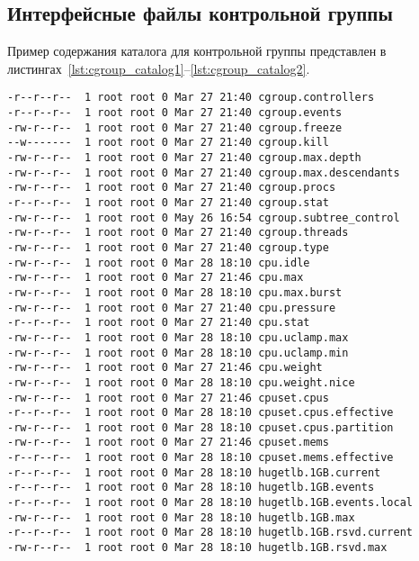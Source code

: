 \begin{appendices}

\chapter{Интерфейсные файлы контрольной группы}

Пример содержания каталога для контрольной группы представлен в листингах~\ref{lst:cgroup_catalog1}--\ref{lst:cgroup_catalog2}.

\begin{lstlisting}[label=lst:cgroup_catalog1, caption={Интерфейсные файлы для контрольной группы}]
-r--r--r--  1 root root 0 Mar 27 21:40 cgroup.controllers
-r--r--r--  1 root root 0 Mar 27 21:40 cgroup.events
-rw-r--r--  1 root root 0 Mar 27 21:40 cgroup.freeze
--w-------  1 root root 0 Mar 27 21:40 cgroup.kill
-rw-r--r--  1 root root 0 Mar 27 21:40 cgroup.max.depth
-rw-r--r--  1 root root 0 Mar 27 21:40 cgroup.max.descendants
-rw-r--r--  1 root root 0 Mar 27 21:40 cgroup.procs
-r--r--r--  1 root root 0 Mar 27 21:40 cgroup.stat
-rw-r--r--  1 root root 0 May 26 16:54 cgroup.subtree_control
-rw-r--r--  1 root root 0 Mar 27 21:40 cgroup.threads
-rw-r--r--  1 root root 0 Mar 27 21:40 cgroup.type
-rw-r--r--  1 root root 0 Mar 28 18:10 cpu.idle
-rw-r--r--  1 root root 0 Mar 27 21:46 cpu.max
-rw-r--r--  1 root root 0 Mar 28 18:10 cpu.max.burst
-rw-r--r--  1 root root 0 Mar 27 21:40 cpu.pressure
-r--r--r--  1 root root 0 Mar 27 21:40 cpu.stat
-rw-r--r--  1 root root 0 Mar 28 18:10 cpu.uclamp.max
-rw-r--r--  1 root root 0 Mar 28 18:10 cpu.uclamp.min
-rw-r--r--  1 root root 0 Mar 27 21:46 cpu.weight
-rw-r--r--  1 root root 0 Mar 28 18:10 cpu.weight.nice
-rw-r--r--  1 root root 0 Mar 27 21:46 cpuset.cpus
-r--r--r--  1 root root 0 Mar 28 18:10 cpuset.cpus.effective
-rw-r--r--  1 root root 0 Mar 28 18:10 cpuset.cpus.partition
-rw-r--r--  1 root root 0 Mar 27 21:46 cpuset.mems
-r--r--r--  1 root root 0 Mar 28 18:10 cpuset.mems.effective
-r--r--r--  1 root root 0 Mar 28 18:10 hugetlb.1GB.current
-r--r--r--  1 root root 0 Mar 28 18:10 hugetlb.1GB.events
-r--r--r--  1 root root 0 Mar 28 18:10 hugetlb.1GB.events.local
-rw-r--r--  1 root root 0 Mar 28 18:10 hugetlb.1GB.max
-r--r--r--  1 root root 0 Mar 28 18:10 hugetlb.1GB.rsvd.current
-rw-r--r--  1 root root 0 Mar 28 18:10 hugetlb.1GB.rsvd.max
\end{lstlisting}


\end{appendices}
